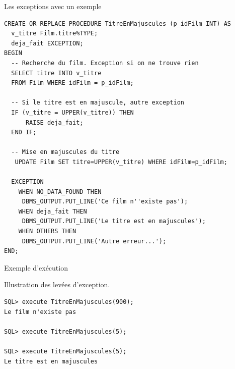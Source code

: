 \begin{frame}[fragile]{Les exceptions avec un exemple}

\begin{scriptsize}
\begin{verbatim}
CREATE OR REPLACE PROCEDURE TitreEnMajuscules (p_idFilm INT) AS
  v_titre Film.titre%TYPE;
  deja_fait EXCEPTION;
BEGIN
  -- Recherche du film. Exception si on ne trouve rien
  SELECT titre INTO v_titre
  FROM Film WHERE idFilm = p_idFilm;

  -- Si le titre est en majuscule, autre exception
  IF (v_titre = UPPER(v_titre)) THEN
      RAISE deja_fait;
  END IF;

  -- Mise en majuscules du titre
   UPDATE Film SET titre=UPPER(v_titre) WHERE idFilm=p_idFilm;

  EXCEPTION
    WHEN NO_DATA_FOUND THEN
     DBMS_OUTPUT.PUT_LINE('Ce film n''existe pas');
    WHEN deja_fait THEN
     DBMS_OUTPUT.PUT_LINE('Le titre est en majuscules');
    WHEN OTHERS THEN
     DBMS_OUTPUT.PUT_LINE('Autre erreur...');
END;
\end{verbatim}
\end{scriptsize}

\end{frame}


\begin{frame}[fragile]{Exemple d'exécution}

Illustration des levées d'exception.

\vfill

\begin{small}
\begin{verbatim}
SQL> execute TitreEnMajuscules(900);
Le film n'existe pas

SQL> execute TitreEnMajuscules(5);

SQL> execute TitreEnMajuscules(5);
Le titre est en majuscules
\end{verbatim}
\end{small}

\end{frame}

